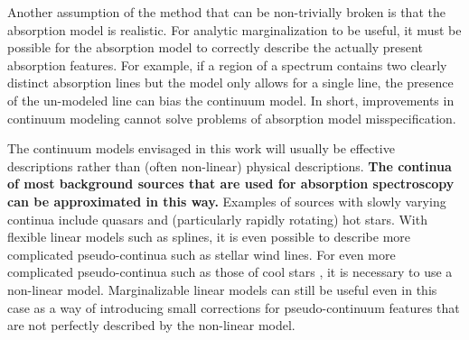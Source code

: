 \documentclass[trackchanges]{aastex62}
\begin{document}
Another assumption of the method that can be non-trivially broken is that the absorption model is realistic.
For analytic marginalization to be useful, it must be possible for the absorption model to correctly describe the actually present absorption features.
For example, if a region of a spectrum contains two clearly distinct absorption lines but the model only allows for a single line, the presence of the un-modeled line can bias the continuum model.
In short, improvements in continuum modeling cannot solve problems of absorption model misspecification.


The continuum models envisaged in this work will usually be effective descriptions rather than (often non-linear) physical descriptions.
{\color{red} \bf The continua of most background sources that are used for absorption spectroscopy can be approximated in this way.}
Examples of sources with slowly varying continua include quasars and (particularly rapidly rotating) hot stars.
With flexible linear models such as splines, it is even possible to describe more complicated pseudo-continua such as stellar wind lines.
For even more complicated pseudo-continua such as those of cool stars \citep[e.g.]{Zasowski:2015hi}, it is necessary to use a non-linear model.
Marginalizable linear models can still be useful even in this case as a way of introducing small corrections for pseudo-continuum features that are not perfectly described by the non-linear model.
\end{document}
